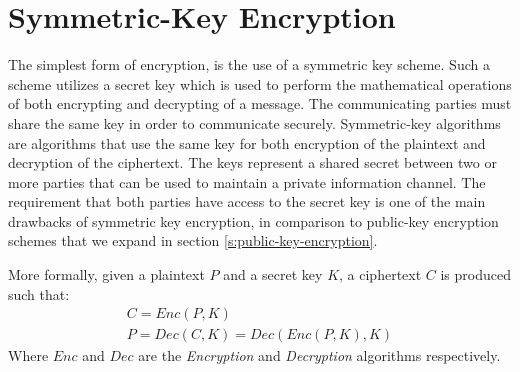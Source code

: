\section{Symmetric-Key Encryption}\label{s:symmetric-key-encryption}
The simplest form of encryption, is the use of a symmetric key scheme. Such a scheme utilizes a secret key which is used to perform the mathematical operations of both encrypting and decrypting of a message.
The communicating parties must share the same key in order to communicate securely.
Symmetric-key algorithms are algorithms that use the same key for both encryption of the plaintext and decryption of the ciphertext.
The keys represent a shared secret between two or more parties that can be used to maintain a private information channel.
The requirement that both parties have access to the secret key is one of the main drawbacks of symmetric key encryption, in comparison to public-key encryption schemes that we expand in section \ref{s:public-key-encryption}.

More formally, given a plaintext $P$ and a secret key $K$, a ciphertext $C$ is produced such that:
\begin{equation}
  \label{eq:symmetric-key-encryption}
  \begin{aligned}
    C = Enc(P, K)\\
    P = Dec(C, K) = Dec(Enc(P, K), K)
  \end{aligned}
  \end{equation}
Where $Enc$ and $Dec$ are the \textit{Encryption} and \textit{Decryption} algorithms respectively.
